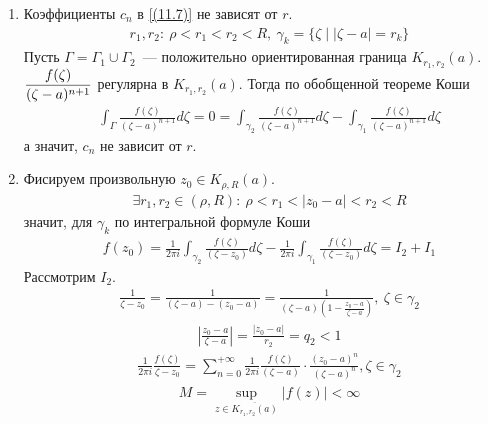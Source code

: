 \pr
\begin{enumerate}
    \item Коэффициенты $c_n$ в \eqref{(11.7)} не зависят от $r$.
    \begin{align*}
      & r_1,r_2: \ \rho < r_1 < r_2 < R, \ \gamma_k = \{\zeta \mid \left| \zeta - a \right| = r_k\}
    \end{align*}
    Пусть $\Gamma = \Gamma_1 \cup \Gamma_2$~--- положительно ориентированная
    граница $K_{r_1,r_2}(a)$.
    \\
    $\displaystyle \frac{f(\zeta)}{(\zeta - a)^{n+1}}$ регулярна в $K_{r_1,r_2}(a)$.
    Тогда по обобщенной теореме Коши
    \begin{align*}
      & \int_{\Gamma} \frac{f(\zeta)}{(\zeta - a)^{n+1}}d\zeta = 0 = \int_{\gamma_2} \frac{f(\zeta)}{(\zeta - a)^{n+1}}d\zeta - \int_{\gamma_1} \frac{f(\zeta)}{(\zeta - a)^{n+1}}d\zeta
    \end{align*}
    а значит, $c_n$ не зависит от $r$.
    \item Фисируем произвольную $z_0 \in K_{\rho,R}(a)$.
    \begin{align*}
      & \exists r_1, r_2 \in (\rho,R): \ \rho < r_1 < \left| z_0-a \right|<r_2<R 
    \end{align*}
    значит, для $\gamma_k$ по интегральной формуле Коши
    \begin{align*}
      & f(z_0) = \frac{1}{2\pi i}\int_{\gamma_2} \frac{f(\zeta)}{(\zeta - z_0)}d\zeta - \frac{1}{2\pi i}\int_{\gamma_1} \frac{f(\zeta)}{(\zeta - z_0)}d\zeta = I_2 + I_1
    \end{align*}
    Рассмотрим $I_2$.
    \begin{align*}
      & \frac{1}{\zeta - z_0} = \frac{1}{(\zeta - a) - (z_0-a)} = \frac{1}{(\zeta - a)\left( 1 - \frac{z_0-a}{\zeta-a} \right)}, \ \zeta \in \gamma_2
    \end{align*}
    \begin{align*}
      & \left| \frac{z_0-a}{\zeta - a} \right| = \frac{\left| z_0-a \right|}{r_2} = q_2 < 1
    \end{align*}
    \begin{align*}
      & \frac{1}{2 \pi i}\frac{f(\zeta)}{\zeta - z_0} = \sum_{n=0}^{+\infty}\frac{1}{2\pi i}\frac{f(\zeta)}{(\zeta - a)} \cdot \frac{(z_0-a)^n}{(\zeta - a)^n}, \zeta \in \gamma_2
    \end{align*}
    \begin{align*}
      & M = \sup_{z \in \overline{K_{r_1,r_2}(a)}}\left| f(z) \right|< \infty
    \end{align*}

\end{enumerate}
